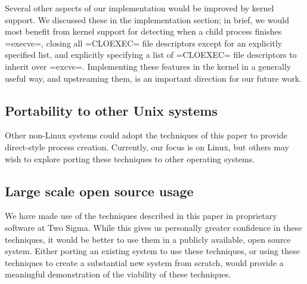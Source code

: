 \documentclass[sigplan]{acmart}
\begin{document}
Several other aspects of our implementation would be improved by kernel support.
We discussed these in the implementation section;
in brief, we would most benefit from kernel support for
detecting when a child process finishes =execve=,
closing all =CLOEXEC= file descriptors except for an explicitly specified list,
and explicitly specifying a list of =CLOEXEC= file descriptors to inherit over =excve=.
Implementing these features in the kernel in a generally useful way, and upstreaming them,
is an important direction for our future work.
\subsection{Portability to other Unix systems}
Other non-Linux systems
could adopt the techniques of this paper
to provide direct-style process creation.
Currently, our focus is on Linux,
but others may wish to explore porting these techniques to other operating systems.
\subsection{Large scale open source usage}
We have made use of the techniques described in this paper
in proprietary software at Two Sigma.
While this gives us personally greater confidence in these techniques,
it would be better to use them in a publicly available, open source system.
Either porting an existing system to use these techniques,
or using these techniques to create a substantial new system from scratch,
would provide a meaningful demonstration of the viability of these techniques.
\end{document}

